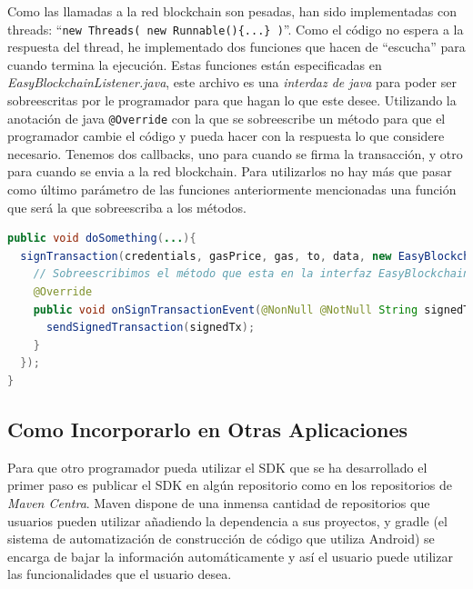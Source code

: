 Como las llamadas a la red blockchain son pesadas, han sido implementadas con threads: ``\verb|new Threads( new Runnable(){...} )|''. Como el código no espera a la respuesta del thread, he implementado dos funciones que hacen de ``escucha'' para cuando termina la ejecución. Estas funciones están especificadas en \emph{EasyBlockchainListener.java}, este archivo es una \emph{interdaz de java} para poder ser sobreescritas por le programador para que hagan lo que este desee. Utilizando la anotación de java \verb|@Override| con la que se sobreescribe un método para que el programador cambie el código y pueda hacer con la respuesta lo que considere necesario. Tenemos dos callbacks, uno para cuando se firma la transacción, y otro para cuando se envia a la red blockchain. Para utilizarlos no hay más que pasar como último parámetro de las funciones anteriormente mencionadas una función que será la que sobreescriba a los métodos.  

\begin{lstlisting}[language=Java,float=ht,caption={[Java] Ejemplo de sobreescritura de un listener.},label=lst:transactionHelper]
public void doSomething(...){
  signTransaction(credentials, gasPrice, gas, to, data, new EasyBlockchainListener() {
    // Sobreescribimos el método que esta en la interfaz EasyBlockchainListener
    @Override
    public void onSignTransactionEvent(@NonNull @NotNull String signedTx) {
      sendSignedTransaction(signedTx);
    }
  });
}
\end{lstlisting}

\subsection{Como Incorporarlo en Otras Aplicaciones} \label{sec:Maven}

Para que otro programador pueda utilizar el SDK que se ha desarrollado el primer paso es publicar el SDK en algún repositorio como en los repositorios de \emph{Maven Centra}\cite{maven}. Maven dispone de una inmensa cantidad de repositorios que usuarios pueden utilizar añadiendo la dependencia a sus proyectos, y gradle (el sistema de automatización de construcción de código que utiliza Android) se encarga de bajar la información automáticamente y así el usuario puede utilizar las funcionalidades que el usuario desea. \\


